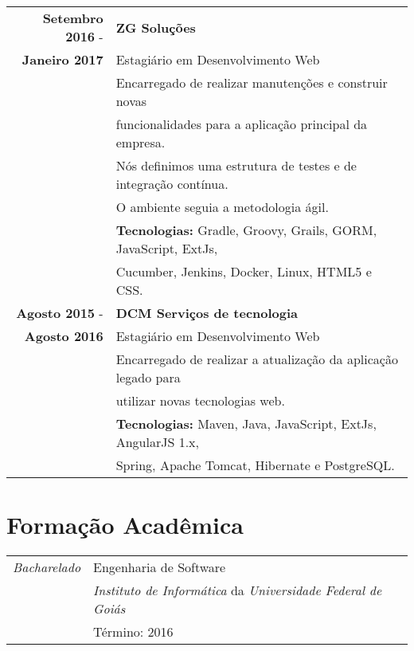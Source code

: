 \documentclass[a4paper,10pt]{article} %
\begin{document}
\begin{tabular}{r|l}

	\textbf{Setembro 2016} - & \textbf{ZG Soluções}\\
	\textbf{Janeiro 2017} & Estagiário em Desenvolvimento Web \\
	& Encarregado de realizar manutenções e construir novas\\
	& funcionalidades para a aplicação principal da empresa.\\
	& Nós definimos uma estrutura de testes e de integração contínua.\\
	& O ambiente seguia a metodologia ágil.\\
	& \textbf{Tecnologias:} Gradle, Groovy, Grails, GORM, JavaScript, ExtJs, \\
	& Cucumber, Jenkins, Docker, Linux, HTML5 e CSS. \\

	\textbf{Agosto 2015} - & \textbf{DCM Serviços de tecnologia} \\
	\textbf{Agosto 2016} & Estagiário em Desenvolvimento Web \\
	& Encarregado de realizar a atualização da aplicação legado para \\
	& utilizar novas tecnologias web. \\
	& \textbf{Tecnologias:} Maven, Java, JavaScript, ExtJs, AngularJS 1.x, \\
	& Spring, Apache Tomcat, Hibernate e PostgreSQL. \\

\end{tabular}


\section{Formação Acadêmica}

\begin{tabular}{r|p{11cm}}
	\emph{Bacharelado} & Engenharia de Software \\
	& \emph{Instituto de Informática} da \emph{Universidade Federal de Goiás} \\
	& Término: 2016\\
\end{tabular}

\end{document}
